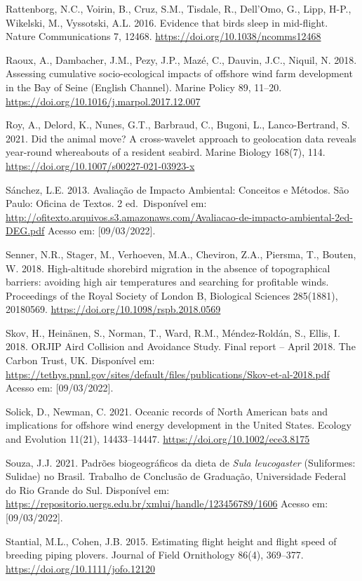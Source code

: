 \documentclass[
  oneside]{scrbook}
\begin{document}
Rattenborg, N.C., Voirin, B., Cruz, S.M., Tisdale, R., Dell'Omo, G., Lipp, H-P., Wikelski, M., Vyssotski, A.L. 2016. Evidence that birds sleep in mid-flight. Nature Communications 7, 12468. \url{https://doi.org/10.1038/ncomms12468}

Raoux, A., Dambacher, J.M., Pezy, J.P., Mazé, C., Dauvin, J.C., Niquil, N. 2018. Assessing cumulative socio-ecological impacts of offshore wind farm development in the Bay of Seine (English Channel). Marine Policy 89, 11--20. \url{https://doi.org/10.1016/j.marpol.2017.12.007}

Roy, A., Delord, K., Nunes, G.T., Barbraud, C., Bugoni, L., Lanco-Bertrand, S. 2021. Did the animal move? A cross-wavelet approach to geolocation data reveals year-round whereabouts of a resident seabird. Marine Biology 168(7), 114. \url{https://doi.org/10.1007/s00227-021-03923-x}

Sánchez, L.E. 2013. Avaliação de Impacto Ambiental: Conceitos e Métodos. São Paulo: Oficina de Textos. 2 ed.~Disponível em: \url{http://ofitexto.arquivos.s3.amazonaws.com/Avaliacao-de-impacto-ambiental-2ed-DEG.pdf} Acesso em: {[}09/03/2022{]}.

Senner, N.R., Stager, M., Verhoeven, M.A., Cheviron, Z.A., Piersma, T., Bouten, W. 2018. High-altitude shorebird migration in the absence of topographical barriers: avoiding high air temperatures and searching for profitable winds. Proceedings of the Royal Society of London B, Biological Sciences 285(1881), 20180569. \url{https://doi.org/10.1098/rspb.2018.0569}

Skov, H., Heinänen, S., Norman, T., Ward, R.M., Méndez-Roldán, S., Ellis, I. 2018. ORJIP Aird Collision and Avoidance Study. Final report -- April 2018. The Carbon Trust, UK. Disponível em: \url{https://tethys.pnnl.gov/sites/default/files/publications/Skov-et-al-2018.pdf} Acesso em: {[}09/03/2022{]}.

Solick, D., Newman, C. 2021. Oceanic records of North American bats and implications for offshore wind energy development in the United States. Ecology and Evolution 11(21), 14433--14447. \url{https://doi.org/10.1002/ece3.8175}

Souza, J.J. 2021. Padrões biogeográficos da dieta de \emph{Sula leucogaster} (Suliformes: Sulidae) no Brasil. Trabalho de Conclusão de Graduação, Universidade Federal do Rio Grande do Sul. Disponível em: \url{https://repositorio.uergs.edu.br/xmlui/handle/123456789/1606} Acesso em: {[}09/03/2022{]}.

Stantial, M.L., Cohen, J.B. 2015. Estimating flight height and flight speed of breeding piping plovers. Journal of Field Ornithology 86(4), 369--377. \url{https://doi.org/10.1111/jofo.12120}
\end{document}
